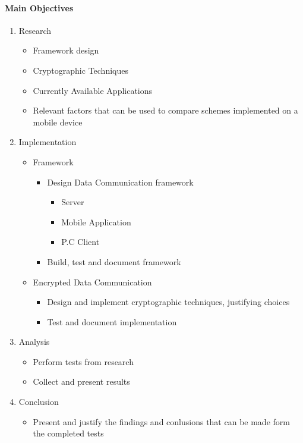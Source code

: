 \documentclass[a4paper,11pt]{article}
\begin{document}
\paragraph{Main Objectives}
\begin{enumerate}
  \item Research
  \begin{itemize}
    \item Framework design
    \item Cryptographic Techniques
    \item Currently Available Applications
    \item Relevant factors that can be used to compare schemes implemented on a mobile device
  \end{itemize}
  \item Implementation
  \begin{itemize}
    \item Framework
    \begin{itemize} 
      \item Design Data Communication framework
      \begin{itemize}
        \item Server
        \item Mobile Application
        \item P.C Client
      \end{itemize}
      \item Build, test and document framework
    \end{itemize}
  \item Encrypted Data Communication
  \begin{itemize}
    \item Design and implement cryptographic techniques, justifying choices
    \item Test and document implementation
  \end{itemize}
  \end{itemize}
  \item Analysis
  \begin{itemize}
    \item Perform tests from research
    \item Collect and present results
  \end{itemize}
  \item Conclusion
  \begin{itemize}
    \item Present and justify the findings and conlusions that can be made form the completed tests

\end{itemize}
\end{enumerate}
\end{document}
